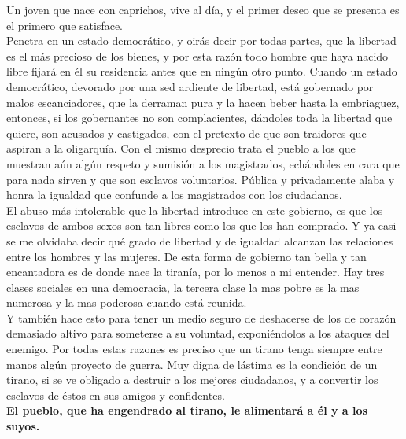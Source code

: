 \documentclass[10pt]{book}
\begin{document}
Un joven que nace con caprichos, vive al día, y el primer deseo que se presenta es el primero que satisface.\\
Penetra en un estado democrático, y oirás decir por todas partes, que la libertad es el más precioso de los bienes, y por esta razón todo hombre que haya nacido libre fijará en él su residencia antes que en ningún otro punto. Cuando un estado democrático, devorado por una sed ardiente de libertad, está gobernado por malos escanciadores, que la derraman pura y la hacen beber hasta la embriaguez, entonces, si los gobernantes no son complacientes, dándoles toda la libertad que quiere, son acusados y castigados, con el pretexto de que son traidores que aspiran a la oligarquía. Con el mismo desprecio trata el pueblo a los que muestran aún algún respeto y sumisión a los magistrados, echándoles en cara que para nada sirven y que son esclavos voluntarios. Pública y privadamente alaba y honra la igualdad que confunde a los magistrados con los ciudadanos.\\ 
El abuso más intolerable que la libertad introduce en este gobierno, es que los esclavos de ambos sexos son tan libres como los que los han comprado. Y ya casi se me olvidaba decir qué grado de libertad y de igualdad alcanzan las relaciones entre los hombres y las mujeres. De esta forma de gobierno tan bella y tan encantadora es de donde nace la tiranía, por lo menos a mi entender. Hay tres clases sociales en una democracia, la tercera clase la mas pobre es la mas numerosa y la mas poderosa cuando está reunida.\\
Y también hace esto para tener un medio seguro de deshacerse de los de corazón demasiado altivo para someterse a su voluntad, exponiéndolos a los ataques del enemigo. Por todas estas razones es preciso que un tirano tenga siempre entre manos algún proyecto de guerra. Muy digna de lástima es la condición de un tirano, si se ve obligado a destruir a los mejores ciudadanos, y a convertir los esclavos de éstos en sus amigos y confidentes. \\
\textbf{El pueblo, que ha engendrado al tirano, le alimentará a él y a los suyos.} 
\end{document}
